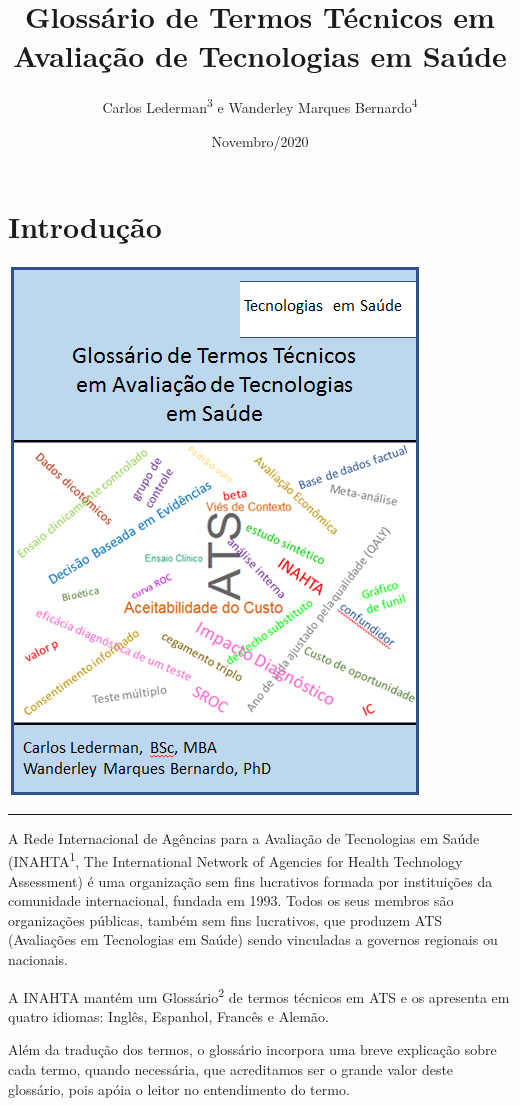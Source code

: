 \documentclass[
  openany]{book}
\title{Glossário de Termos Técnicos em Avaliação de Tecnologias em Saúde}
\author{Carlos Lederman\textsuperscript{3} e Wanderley Marques Bernardo\textsuperscript{4}}
\date{Novembro/2020}
\begin{document}
\maketitle

\hypertarget{introduuxe7uxe3o}{%
\chapter*{Introdução}\label{introduuxe7uxe3o}}

\begin{center}\includegraphics[width=height=4in,width=3in]{capa11} \end{center}

\begin{center}\rule{0.5\linewidth}{0.5pt}\end{center}

A Rede Internacional de Agências para a Avaliação de Tecnologias em Saúde (INAHTA\textsuperscript{1}, The International Network of Agencies for Health Technology Assessment) é uma organização sem fins lucrativos formada por instituições
da comunidade internacional, fundada em 1993. Todos os seus membros são organizações públicas, também sem fins lucrativos, que produzem ATS (Avaliações em Tecnologias em Saúde) sendo vinculadas a governos regionais ou nacionais.

A INAHTA mantém um Glossário\textsuperscript{2} de termos técnicos em ATS e os apresenta em quatro idiomas: Inglês, Espanhol, Francês e Alemão.

Além da tradução dos termos, o glossário incorpora uma breve explicação sobre cada termo, quando necessária, que acreditamos ser o grande valor deste glossário, pois apóia o leitor no entendimento do termo.
\end{document}
